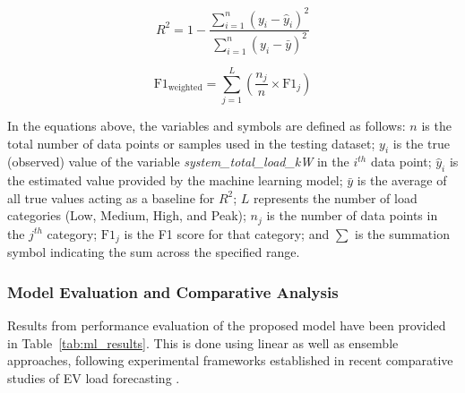 \documentclass{thesis-library}
\begin{document}
{\begin{equation}
    R^2 = 1 - \frac{\sum_{i=1}^{n} (y_i - \hat{y}_i)^2}{\sum_{i=1}^{n} (y_i - \bar{y})^2}
\end{equation}

\begin{equation}
    \text{F1}_{\text{weighted}} = \sum_{j=1}^{L} \left( \frac{n_j}{n} \times \text{F1}_j \right)
\end{equation}

In the equations above, the variables and symbols are defined as follows: $n$ is the total number of data points or samples used in the testing dataset; $y_i$ is the true (observed) value of the variable \textit{system\_total\_load\_kW} in the $i^{th}$ data point; $\hat{y}_i$ is the estimated value provided by the machine learning model; $\bar{y}$ is the average of all true values acting as a baseline for $R^2$; $L$ represents the number of load categories (Low, Medium, High, and Peak); $n_j$ is the number of data points in the $j^{th}$ category; $\text{F1}_j$ is the F1 score for that category; and $\sum$ is the summation symbol indicating the sum across the specified range.

\subsubsection{Model Evaluation and Comparative Analysis}

Results from performance evaluation of the proposed model have been provided in Table~\ref{tab:ml_results}. This is done using linear as well as ensemble approaches, following experimental frameworks established in recent comparative studies of EV load forecasting \cite{kyriakopoulos_experimental_2026}.

}
\end{document}
